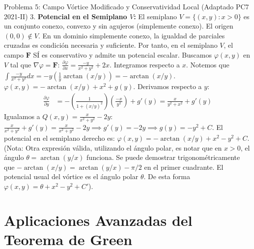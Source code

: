 \documentclass[11pt,a4paper]{article}
\begin{document}
\begin{ejerciciobox}{Problema 5: Campo Vórtice Modificado y Conservatividad Local (Adaptado PC7 2021-II)}
3. \textbf{Potencial en el Semiplano $V$:}
El semiplano $V = \{(x,y) : x > 0\}$ es un conjunto conexo, convexo y sin agujeros (simplemente conexo). El origen $(0,0) \notin V$.
En un dominio simplemente conexo, la igualdad de parciales cruzadas es condición necesaria y suficiente. Por tanto, en el semiplano $V$, el campo $\mathbf{F}$ SÍ es conservativo y admite un potencial escalar.
Buscamos $\varphi(x,y)$ en $V$ tal que $\nabla \varphi = \mathbf{F}$:
$\frac{\partial \varphi}{\partial x} = \frac{-y}{x^2+y^2} + 2x$.
Integramos respecto a $x$. Notemos que $\int \frac{-y}{x^2+y^2} dx = -y \left( \frac{1}{y} \arctan(x/y) \right) = -\arctan(x/y)$.
$\varphi(x,y) = -\arctan(x/y) + x^2 + g(y)$.
Derivamos respecto a $y$:
\begin{align*}
\frac{\partial \varphi}{\partial y} &= -\left( \frac{1}{1+(x/y)^2} \right) \left(\frac{-x}{y^2}\right) + g'(y) = \frac{x}{y^2+x^2} + g'(y)
\end{align*}
Igualamos a $Q(x,y) = \frac{x}{x^2+y^2} - 2y$:
$\frac{x}{x^2+y^2} + g'(y) = \frac{x}{x^2+y^2} - 2y \implies g'(y) = -2y \implies g(y) = -y^2 + C$.
El potencial en el semiplano derecho es:
$\varphi(x,y) = -\arctan(x/y) + x^2 - y^2 + C$.
(Nota: Otra expresión válida, utilizando el ángulo polar, es notar que en $x>0$, el ángulo $\theta = \arctan(y/x)$ funciona. Se puede demostrar trigonométricamente que $-\arctan(x/y) = \arctan(y/x) - \pi/2$ en el primer cuadrante. El potencial usual del vórtice es el ángulo polar $\theta$. De esta forma $\varphi(x,y) = \theta + x^2 - y^2 + C'$).

\end{ejerciciobox}

\section{Aplicaciones Avanzadas del Teorema de Green}
\end{document}
